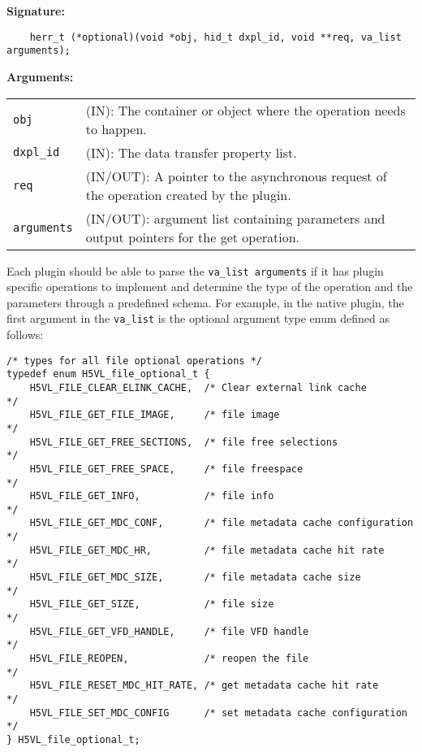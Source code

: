 \textbf{Signature:}
\begin{lstlisting}
    herr_t (*optional)(void *obj, hid_t dxpl_id, void **req, va_list arguments);
\end{lstlisting}

\textbf{Arguments:}\\
\begin{tabular}{l p{10cm}}
  {\tt obj} & (IN): The container or object where the operation needs to happen.\\
  {\tt dxpl\_id} & (IN): The data transfer property list.\\
  {\tt req} & (IN/OUT): A pointer to the asynchronous request of the operation created by the plugin.\\
  {\tt arguments} & (IN/OUT): argument list containing parameters and output pointers for the get operation. \\
\end{tabular}

Each plugin should be able to parse the {\tt va\_list arguments} if it has plugin specific operations to implement and determine the type of the operation and the parameters through a predefined schema. For example, in the native plugin, the first argument in the {\tt va\_list} is the optional argument type enum defined as follows:

\begin{lstlisting}
/* types for all file optional operations */
typedef enum H5VL_file_optional_t {
    H5VL_FILE_CLEAR_ELINK_CACHE,  /* Clear external link cache         */
    H5VL_FILE_GET_FILE_IMAGE,     /* file image                        */
    H5VL_FILE_GET_FREE_SECTIONS,  /* file free selections              */
    H5VL_FILE_GET_FREE_SPACE,     /* file freespace                    */
    H5VL_FILE_GET_INFO,           /* file info                         */
    H5VL_FILE_GET_MDC_CONF,       /* file metadata cache configuration */
    H5VL_FILE_GET_MDC_HR,         /* file metadata cache hit rate      */
    H5VL_FILE_GET_MDC_SIZE,       /* file metadata cache size          */
    H5VL_FILE_GET_SIZE,           /* file size                         */
    H5VL_FILE_GET_VFD_HANDLE,     /* file VFD handle                   */
    H5VL_FILE_REOPEN,             /* reopen the file                   */
    H5VL_FILE_RESET_MDC_HIT_RATE, /* get metadata cache hit rate       */
    H5VL_FILE_SET_MDC_CONFIG      /* set metadata cache configuration  */
} H5VL_file_optional_t;
\end{lstlisting}


